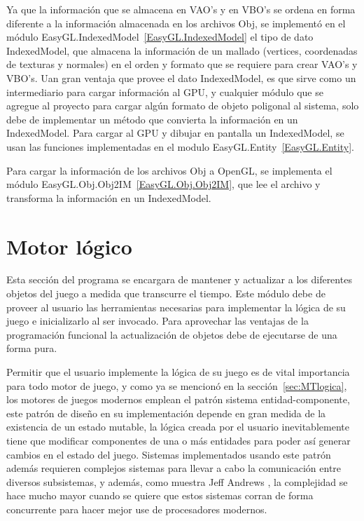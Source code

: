 Ya que la información que se almacena en VAO's y en VBO's se ordena en forma diferente a la información almacenada en los archivos Obj, se implementó en el módulo EasyGL.IndexedModel~\ref{EasyGL.IndexedModel} el tipo de dato IndexedModel, que almacena la información de un mallado (vertices, coordenadas de texturas y normales) en el orden y formato que se requiere para crear VAO's y VBO's. Uan gran ventaja que provee el dato IndexedModel, es que sirve como un intermediario para cargar información al GPU, y cualquier módulo que se agregue al proyecto para cargar algún formato de objeto poligonal al sistema, solo debe de implementar un método que convierta la información en un IndexedModel. Para cargar al GPU y dibujar en pantalla un IndexedModel, se usan las funciones implementadas en el modulo EasyGL.Entity~\ref{EasyGL.Entity}.

Para cargar la información de los archivos Obj a OpenGL, se implementa el módulo EasyGL.Obj.Obj2IM~\ref{EasyGL.Obj.Obj2IM}, que lee el archivo y transforma la información en un IndexedModel.



\section{Motor lógico}

Esta sección del programa se encargara de mantener y actualizar a los diferentes objetos del juego a medida que transcurre el tiempo. Este módulo debe de proveer al usuario las herramientas necesarias para implementar la lógica de su juego e inicializarlo al ser invocado. Para aprovechar las ventajas de la programación funcional la actualización de objetos debe de ejecutarse de una forma pura.

Permitir que el usuario implemente la lógica de su juego es de vital importancia para todo motor de juego, y como ya se mencionó en la sección~\ref{sec:MTlogica}, los motores de juegos modernos emplean el patrón sistema entidad-componente, este patrón de diseño en su implementación depende en gran medida de la existencia de un estado mutable, la lógica creada por el usuario inevitablemente tiene que modificar componentes de una o más entidades para poder así generar cambios en el estado del juego. Sistemas implementados usando este patrón además requieren complejos sistemas para llevar a cabo la comunicación entre diversos subsistemas, y además, como muestra Jeff Andrews \cite{andrews2009designing}, la complejidad se hace mucho mayor cuando se quiere que estos sistemas corran de forma concurrente para hacer mejor use de procesadores modernos.


